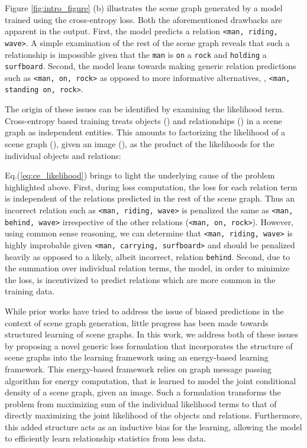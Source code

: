 \documentclass[final]{cvpr}
\begin{document}
Figure \ref{fig:intro_figure} (b) illustrates the scene graph generated by a model \cite{tang2019learning} trained using the cross-entropy loss. Both the aforementioned drawbacks are apparent in the output. First, the model predicts a relation \texttt{<man, riding, wave>}. A simple examination of the rest of the scene graph reveals that such a relationship is impossible given that the \texttt{man} is \texttt{on} a \texttt{rock} and \texttt{holding} a \texttt{surfboard}. Second, the model leans towards making generic relation predictions such as \texttt{<man, on, rock>} as opposed to more informative alternatives, \eg, \texttt{<man, standing on, rock>}. 

The origin of these issues can be identified by examining the likelihood term. Cross-entropy based training treats objects () and relationships () in a scene graph as independent entities. This amounts to factorizing the likelihood of a scene graph (), given an image (), as the product of the likelihoods for the individual objects and relations:

Eq.(\ref{eq:ce_likelihood}) brings to light the underlying cause of the problem highlighted above. First, during loss computation, the loss for each relation term is independent of the relations predicted in the rest of the scene graph.  Thus an incorrect relation such as \texttt{<man, riding, wave>} is penalized the same as \texttt{<man, behind, wave>} irrespective of the other relations (\texttt{<man, on, rock>}). However, using common sense reasoning, we can determine that \texttt{<man, riding, wave>} is highly improbable given \texttt{<man, carrying, surfboard>} and should be penalized heavily as opposed to a likely, albeit incorrect, relation \texttt{behind}. Second, due to the summation over individual relation terms, the model, in order to minimize the loss, is incentivized to predict relations which are more common in the training data.



While prior works have tried to address the issue of biased predictions \cite{Lin_2020_CVPR, tang2020unbiased} in the context of scene graph generation, little progress has been made towards structured learning of scene graphs. 
In this work, we address both of these issues by proposing a novel generic loss formulation that incorporates the structure of scene graphs into the learning framework using an energy-based learning framework. This energy-based framework relies on graph message passing algorithm for energy computation, that is learned to model the joint conditional density of a scene graph, given an image.
Such a formulation transforms the problem from maximizing sum of the individual likelihood terms to that of directly maximizing the joint likelihood of the objects and relations.
Furthermore, this added structure acts as an inductive bias for the learning, allowing the model to efficiently learn relationship statistics from less data. 
\end{document}
